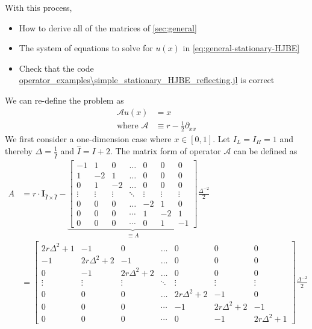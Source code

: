 \documentclass[11pt]{article}
\newcommand{\A}{\ensuremath{\mathcal{A}}}
\begin{document}
With this process,
\begin{itemize}
	\item How to derive all of the matrices of \cref{sec:general}
	\item The system of equations to solve for $u(x)$ in \cref{eq:general-stationary-HJBE}
	\item Check that the code \url{operator_examples\simple_stationary_HJBE_reflecting.jl} is correct
\end{itemize}
We can re-define the problem as 
\begin{align}
\A u(x) &= x\label{HJBE_reflecting_barriers_PDE}\\
\text{where }\A&\equiv r - \frac{1}{2}\partial_{xx}
\end{align}
We first consider a one-dimension case where $x\in [0, 1]$. Let $I_L = I_H = 1$ and thereby $\Delta  = \frac{1}{\hat{I}}$ and $\hat{I} = I+2$. The matrix form of operator $\A$ can be defined as
\begin{align}
A &= r\cdot \mathbf{I}_{\hat{I}\times\hat{I}}-\underbrace{\begin{bmatrix}
-1&1&0&\dots&0&0&0\\
1&-2&1&\dots&0&0&0\\
0&1&-2&\dots&0&0&0\\
\vdots&\vdots&\vdots&\ddots&\vdots&\vdots&\vdots\\
0&0&0&\dots&-2&1&0\\
0&0&0&\cdots&1&-2&1\\
0&0&0&\cdots&0&1&-1
\end{bmatrix}}_{\equiv A}\frac{\Delta^{-2}}{2}\nonumber\\
&=
\begin{bmatrix}
2r\Delta^2+1&-1&0&\dots&0&0&0\\
-1&2r\Delta^2+2&-1&\dots&0&0&0\\
0&-1&2r\Delta^2+2&\dots&0&0&0\\
\vdots&\vdots&\vdots&\ddots&\vdots&\vdots&\vdots\\
0&0&0&\dots&2r\Delta^2+2&-1&0\\
0&0&0&\cdots&-1&2r\Delta^2+2&-1\\
0&0&0&\cdots&0&-1&2r\Delta^2+1
\end{bmatrix}\frac{\Delta^{-2}}{2}
\end{align}
\end{document}
